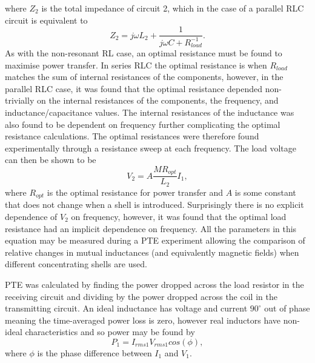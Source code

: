 \documentclass[11pt]{iopart}
\begin{document}
\vspace{-0.2em}
where $Z_2$ is the total impedance of circuit 2, which in the case of
a parallel RLC circuit is equivalent to
\vspace{-0.5em}
\begin{equation}
  Z_2 = j\omega L_2 + \frac{1}{j\omega C + R_{load}^{-1}}.
\end{equation}
\vspace{-0.2em}
As with the non-resonant RL case, an optimal resistance must be found to maximise
power transfer. In series RLC the optimal resistance is when
$R_{load}$ matches the sum of internal resistances of the components,
however, in the parallel RLC case, it was found that the optimal
resistance depended non-trivially on the internal resistances of the
components, the frequency, and inductance/capacitance values. The
internal resistances of the inductance was also found to be dependent
on frequency further complicating the optimal resistance calculations.
The optimal resistances were therefore found experimentally through a
resistance sweep at each frequency.  The load voltage can then be
shown to be
\vspace{-0.5em}
\begin{equation}
    V_2 = A \frac{MR_{opt}}{L_2}I_1,
\label{eqn:RLC-M}
\end{equation}
\vspace{-0.2em}
where $R_{opt}$ is the optimal resistance for power transfer and $A$
is some constant that does not change when a shell is
introduced. Surprisingly there is no explicit dependence of $V_2$ on
frequency, however, it was found that the optimal load resistance had
an implicit dependence on frequency. All the parameters in this
equation may be measured during a PTE experiment allowing the
comparison of relative changes in mutual inductances (and equivalently
magnetic fields) when different concentrating shells are used.

PTE was calculated by finding the power dropped across the load
resistor in the receiving circuit and dividing by the power dropped across the
coil in the transmitting circuit. An ideal inductance has voltage and current
$90^\circ$ out of phase meaning the time-averaged power loss is zero,
however real inductors have non-ideal characteristics and so power may
be found by
\vspace{-0.2em}
\begin{equation}
    P_1 = I_{rms1}V_{rms1}cos(\phi),
\label{eqn:P1}
\end{equation}
\vspace{-0.2em}
where $\phi$ is the phase difference between $I_1$ and $V_1$.
\end{document}
